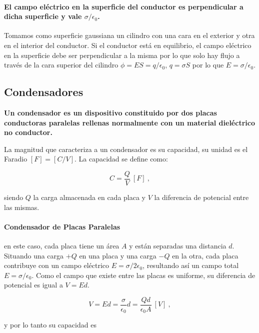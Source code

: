 \documentclass{tufte-handout}
\begin{document}
\paragraph{El campo eléctrico en la superficie del conductor es perpendicular a dicha superficie y vale $\sigma / \epsilon_0$.} Tomamos como superficie gaussiana un cilindro con una cara en el exterior y otra en el interior del conductor. Si el conductor está en equilibrio, el campo eléctrico en la superficie debe ser perpendicular a la misma por lo que solo hay flujo a través de la cara superior del cilindro $\phi = ES = q / \epsilon_0$, $q = \sigma S$ por lo que $E = \sigma / \epsilon_0$.

\subsection{Condensadores}

\textbf{Un condensador es un dispositivo constituido por dos placas conductoras paralelas rellenas normalmente con un material dieléctrico no conductor.}

La magnitud que caracteriza a un condensador es su capacidad, su unidad es el Faradio $[F] = [C/V]$. La capacidad se define como: 

\begin{equation}
C = \frac{Q}{V}~[F]~,
\end{equation}

siendo $Q$ la carga almacenada en cada placa y $V$ la diferencia de potencial entre las mismas.

\paragraph{Condensador de Placas Paralelas} en este caso, cada placa tiene un área $A$ y están separadas una distancia $d$. Situando una carga $+Q$ en una placa y una carga $-Q$ en la otra, cada placa contribuye con un campo eléctrico $E = \sigma/2\epsilon_0$, resultando así un campo total $E = \sigma /\epsilon_0$. Como el campo que existe entre las placas es uniforme, su diferencia de potencial es igual a $V = Ed$.

\begin{equation}
V = Ed = \frac{\sigma}{\epsilon_0}d = \frac{Qd}{\epsilon_0A}~[V]~,
\end{equation}

y por lo tanto su capacidad es
\end{document}
